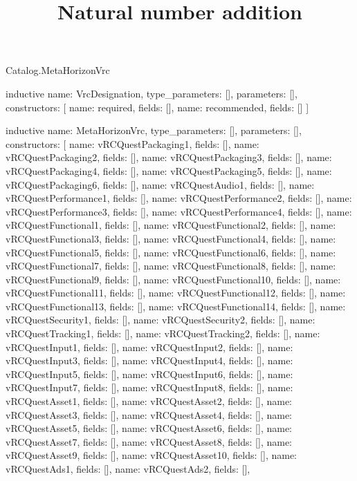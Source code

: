 \begin{lexlean}{Catalog.MetaHorizonVrc}
\title{Natural number addition}
\begin{semanticmodule}
inductive{
  name: VrcDesignation,
  type_parameters: [],
  parameters: [],
  constructors: [
    {name: required, fields: []},
    {name: recommended, fields: []}
  ]
}

inductive{
  name: MetaHorizonVrc,
  type_parameters: [],
  parameters: [],
  constructors: [
    {name: vRCQuestPackaging1, fields: []},
    {name: vRCQuestPackaging2, fields: []},
    {name: vRCQuestPackaging3, fields: []},
    {name: vRCQuestPackaging4, fields: []},
    {name: vRCQuestPackaging5, fields: []},
    {name: vRCQuestPackaging6, fields: []},
    {name: vRCQuestAudio1, fields: []},
    {name: vRCQuestPerformance1, fields: []},
    {name: vRCQuestPerformance2, fields: []},
    {name: vRCQuestPerformance3, fields: []},
    {name: vRCQuestPerformance4, fields: []},
    {name: vRCQuestFunctional1, fields: []},
    {name: vRCQuestFunctional2, fields: []},
    {name: vRCQuestFunctional3, fields: []},
    {name: vRCQuestFunctional4, fields: []},
    {name: vRCQuestFunctional5, fields: []},
    {name: vRCQuestFunctional6, fields: []},
    {name: vRCQuestFunctional7, fields: []},
    {name: vRCQuestFunctional8, fields: []},
    {name: vRCQuestFunctional9, fields: []},
    {name: vRCQuestFunctional10, fields: []},
    {name: vRCQuestFunctional11, fields: []},
    {name: vRCQuestFunctional12, fields: []},
    {name: vRCQuestFunctional13, fields: []},
    {name: vRCQuestFunctional14, fields: []},
    {name: vRCQuestSecurity1, fields: []},
    {name: vRCQuestSecurity2, fields: []},
    {name: vRCQuestTracking1, fields: []},
    {name: vRCQuestTracking2, fields: []},
    {name: vRCQuestInput1, fields: []},
    {name: vRCQuestInput2, fields: []},
    {name: vRCQuestInput3, fields: []},
    {name: vRCQuestInput4, fields: []},
    {name: vRCQuestInput5, fields: []},
    {name: vRCQuestInput6, fields: []},
    {name: vRCQuestInput7, fields: []},
    {name: vRCQuestInput8, fields: []},
    {name: vRCQuestAsset1, fields: []},
    {name: vRCQuestAsset2, fields: []},
    {name: vRCQuestAsset3, fields: []},
    {name: vRCQuestAsset4, fields: []},
    {name: vRCQuestAsset5, fields: []},
    {name: vRCQuestAsset6, fields: []},
    {name: vRCQuestAsset7, fields: []},
    {name: vRCQuestAsset8, fields: []},
    {name: vRCQuestAsset9, fields: []},
    {name: vRCQuestAsset10, fields: []},
    {name: vRCQuestAds1, fields: []},
    {name: vRCQuestAds2, fields: []},
}
\end{semanticmodule}
\end{lexlean}
